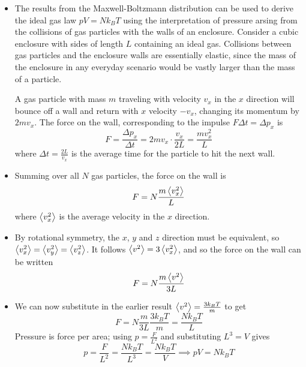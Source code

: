 \documentclass[11pt, a4paper]{article}
\begin{document}
\begin{itemize}
	\item The results from the Maxwell-Boltzmann distribution can be used to derive the ideal gas law $ pV = Nk_{B}T $ using the interpretation of pressure arsing from the collisions of gas particles with the walls of an enclosure. Consider a cubic enclosure with sides of length $ L $ containing an ideal gas. Collisions between gas particles and the enclosure walls are essentially elastic, since the mass of the enclosure in any everyday scenario would be vastly larger than the mass of a particle.
	
	A gas particle with mass $ m $ traveling with velocity $ v_{x} $ in the $ x $ direction will bounce off a wall and return with $ x $ velocity $ - v_{x} $, changing its momentum by $ 2 m v_{x}$. The force on the wall, corresponding to the impulse $ F \Delta t = \Delta p_{x}  $ is
	\begin{equation*}
		F = \frac{\Delta p_{x}}{\Delta t} = 2mv_{x}\cdot \frac{v_{x}}{2L}= \frac{mv_{x}^{2}}{L}
	\end{equation*}
	where $ \Delta t = \frac{2L}{v_{x}} $ is the average time for the particle to hit the next wall. 
	
	\item Summing over all $ N $ gas particles, the force on the wall is
	\begin{equation*}
		F = N \frac{m \expval{v_{x}^{2}}}{L}
	\end{equation*}
	where $ \expval{v_{x}^{2}} $ is the average velocity in the $ x $ direction. 
	
	\item By rotational symmetry, the $ x $, $ y $ and $ z $ direction must be equivalent, so $ \expval{v_{x}^{2}} = \expval{v_{y}^{2}} = \expval{v_{z}^{2}} $. It follows  $ \expval{v^{2}} = 3 \expval{v_{x}^{2}} $, and so the force on the wall can be written
	\begin{equation*}
		F = N \frac{m \expval{v^{2}}}{3L}
	\end{equation*}
	
	\item We can now substitute in the earlier result $ \expval{v^{2}} = \frac{3k_{B}T}{m}$ to get
	\begin{equation*}
		F = N \frac{m}{3L} \frac{3k_{B}T}{m} = \frac{Nk_{B}T}{L}
	\end{equation*}
	Pressure is force per area; using $ p = \frac{F}{L^{2}} $ and substituting $ L^{3} = V $ gives
	\begin{equation*}
		p = \frac{F}{L^{2}} = \frac{Nk_{B}T}{L^{3}} = \frac{Nk_{B}T}{V} \implies pV = Nk_{B}T
	\end{equation*}
\end{itemize}
\end{document}
